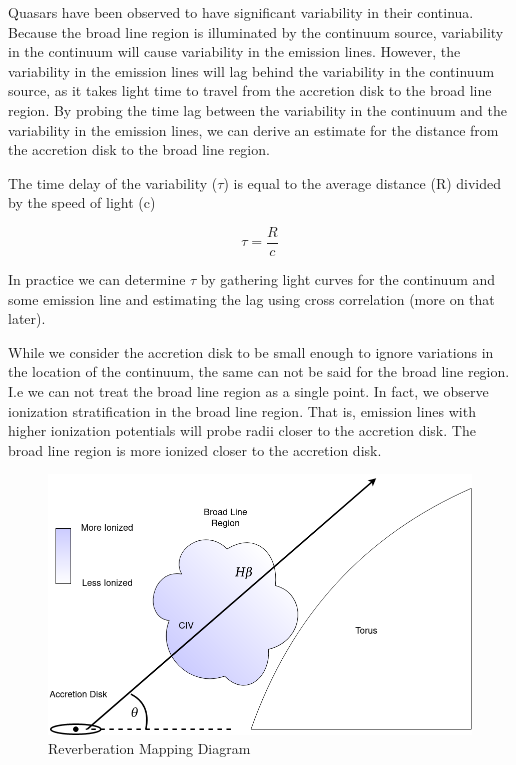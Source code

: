 \documentclass[]{article}
\begin{document}
Quasars have been observed to have significant variability in their
continua. Because the broad line region is illuminated by the continuum
source, variability in the continuum will cause variability in the
emission lines. However, the variability in the emission lines will lag
behind the variability in the continuum source, as it takes light time
to travel from the accretion disk to the broad line region. By probing
the time lag between the variability in the continuum and the
variability in the emission lines, we can derive an estimate for the
distance from the accretion disk to the broad line region.

The time delay of the variability (\(\tau\)) is equal to the average
distance (R) divided by the speed of light (c)

\[\tau=\frac{R}{c}\]

In practice we can determine \(\tau\) by gathering light curves for the
continuum and some emission line and estimating the lag using cross
correlation (more on that later).

While we consider the accretion disk to be small enough to ignore
variations in the location of the continuum, the same can not be said
for the broad line region. I.e we can not treat the broad line region as
a single point. In fact, we observe ionization stratification in the
broad line region. That is, emission lines with higher ionization
potentials will probe radii closer to the accretion disk. The broad line
region is more ionized closer to the accretion disk.

\begin{figure}
\centering
\includegraphics{./ReverberationMapping.png}
\caption{Reverberation Mapping Diagram}
\end{figure}
\end{document}
